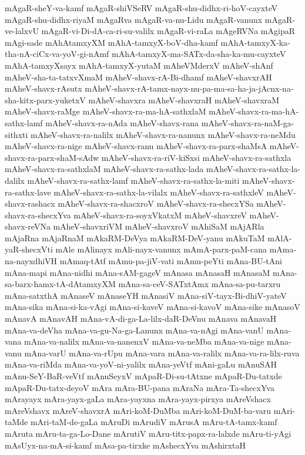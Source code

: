 {mAgaR-sheY-va-kamf
mAgaR-shiVSeRV
mAgaR-shu-didhx-ri-hoV-cayxteV
mAgaR-shu-didhx-riyaM
mAgaRva
mAgaR-va-nu-Lidu
mAgaR-vanunx
mAgaR-ve-lalxvU
mAgaR-vi-Di-dA-ca-ri-su-valilx
mAgaR-vi-raLa
mAgeRVNa
mAgipaR
mAgi-sade
mAhAtamxyXM
mAhA-tamxyX-boV-dha-kamf
mAhA-tamxyX-ka-tha-nA-ciCx-va-yoV-gi-nAmf
mAhA-tamxyX-ma-SATx-da-sha-ka-mu-cayxteV
mAhA-tamxyXsayx
mAhA-tamxyX-yutaM
mAheVMderxV
mAheV-shAnf
mAheV-sha-ta-tatxvXmaM
mAheV-shavx-rA-Bi-dhamf
mAheV-shavxrAH
mAheV-shavx-rAsutx
mAheV-shavx-rA-tamx-nayx-nu-pa-ma-sa-ha-ja-jAcnx-na-sha-kitx-parx-yuketxV
mAheV-shavxra
mAheV-shavxraH
mAheV-shavxraM
mAheV-shavx-raMge
mAheV-shavx-ra-ma-hA-sathxlaM
mAheV-shavx-ra-ma-hA-sathx-lamf
mAheV-shavx-ra-nAda
mAheV-shavx-rana
mAheV-shavx-ra-naM-ga-sithxti
mAheV-shavx-ra-nalilx
mAheV-shavx-ra-nanunx
mAheV-shavx-ra-neMdu
mAheV-shavx-ra-nige
mAheV-shavx-ranu
mAheV-shavx-ra-parx-shaMsA
mAheV-shavx-ra-parx-shaM-sAdw
mAheV-shavx-ra-riV-kiSxsi
mAheV-shavx-ra-sathxla
mAheV-shavx-ra-sathxlaM
mAheV-shavx-ra-sathx-lada
mAheV-shavx-ra-sathx-la-dalilx
mAheV-shavx-ra-sathx-lamf
mAheV-shavx-ra-sathx-la-miti
mAheV-shavx-ra-sathx-lave
mAheV-shavx-ra-sathx-la-vilalx
mAheV-shavx-ra-sathxleV
mAheV-shavx-rashacx
mAheV-shavx-ra-shacxroV
mAheV-shavx-ra-shecxYSa
mAheV-shavx-ra-shecxYva
mAheV-shavx-ra-soyxVkatxM
mAheV-shavxreV
mAheV-shavx-reVNa
mAheV-shavxriVM
mAheV-shavxroV
mAhiSaM
mAjARla
mAjaRna
mAjaRnaM
mAkaRM-DeVya
mAkaRM-DeV-yanu
mAkuTaM
mAlA-yaR-shecxVti
mAle
mAlinayx
mAli-nayx-vanunx
mAmA-parx-paM-cana
mAma-na-nayxdhiVH
mAmaq-tAtf
mAmu-pa-jiV-vati
mAmu-peYti
mAna-BU-tAni
mAna-mapi
mAna-nidhi
mAna-sAM-gageV
mAnasa
mAnasaH
mAnasaM
mAna-sa-barx-hamx-tA-dAtamxyXM
mAna-sa-ceV-SATxtAmx
mAna-sa-pu-tarxru
mAna-satxthA
mAnaseV
mAnaseYH
mAnasiV
mAna-siV-tayx-Bi-dhiV-yateV
mAna-sika
mAna-si-ka-vAgi
mAna-si-kaveV
mAna-si-kavoV
mAna-sike
mAnasoV
mAnavA
mAnavAH
mAna-vA-di-ga-La-lilx-daR-DeVnu
mAnava
mAnavaH
mAna-va-deVha
mAna-va-gu-Na-ga-Lanunx
mAna-va-nAgi
mAna-vanU
mAna-vana
mAna-va-nalilx
mAna-va-nanenxV
mAna-va-neMba
mAna-va-nige
mAna-vanu
mAna-varU
mAna-va-rUpu
mAna-vara
mAna-va-ralilx
mAna-va-ra-lilx-ruva
mAna-va-riMda
mAna-va-yoV-ni-yalilx
mAna-yeVtf
mAni-gaLu
mAnuSAH
mAnu-SeY-BaR-veVtf
mAnuSeyxV
mApaR-Di-su-tAtxne
mApaR-Du-tatxde
mApaR-Du-tatx-deyoV
mAra
mAra-BU-pana
mAraNa
mAra-Ta-shecxYva
mArayayx
mAra-yayx-gaLa
mAra-yayxna
mAra-yayx-pirxya
mAreVshacx
mAreVshavx
mAreV-shavxrA
mAri-koM-DuMba
mAri-koM-DuM-ba-varu
mAri-taMde
mAri-taM-de-gaLa
mAruDi
mArudiV
mArusA
mAru-tA-tamx-kamf
mAruta
mAru-ta-ga-Lo-Dane
mArutiV
mAru-titx-papx-ra-lalxde
mAru-ti-yAgi
mAsUyx-na-mA-si-kamf
mAsa-pa-tirxke
mAshecxYva
mAshirxtaH
}
